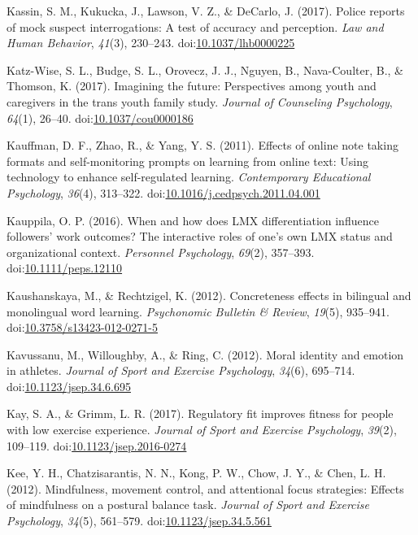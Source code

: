 \documentclass[english,man]{apa6}
\theoremstyle{definition}
\theoremstyle{definition}
\theoremstyle{definition}
\theoremstyle{remark}
\begin{document}
\hypertarget{ref-Kassin2017}{}
Kassin, S. M., Kukucka, J., Lawson, V. Z., \& DeCarlo, J. (2017). Police
reports of mock suspect interrogations: A test of accuracy and
perception. \emph{Law and Human Behavior}, \emph{41}(3), 230--243.
doi:\href{https://doi.org/10.1037/lhb0000225}{10.1037/lhb0000225}

\hypertarget{ref-Katz-Wise2017}{}
Katz-Wise, S. L., Budge, S. L., Orovecz, J. J., Nguyen, B.,
Nava-Coulter, B., \& Thomson, K. (2017). Imagining the future:
Perspectives among youth and caregivers in the trans youth family study.
\emph{Journal of Counseling Psychology}, \emph{64}(1), 26--40.
doi:\href{https://doi.org/10.1037/cou0000186}{10.1037/cou0000186}

\hypertarget{ref-Kauffman2011}{}
Kauffman, D. F., Zhao, R., \& Yang, Y. S. (2011). Effects of online note
taking formats and self-monitoring prompts on learning from online text:
Using technology to enhance self-regulated learning. \emph{Contemporary
Educational Psychology}, \emph{36}(4), 313--322.
doi:\href{https://doi.org/10.1016/j.cedpsych.2011.04.001}{10.1016/j.cedpsych.2011.04.001}

\hypertarget{ref-Kauppila2016}{}
Kauppila, O. P. (2016). When and how does LMX differentiation influence
followers' work outcomes? The interactive roles of one's own LMX status
and organizational context. \emph{Personnel Psychology}, \emph{69}(2),
357--393.
doi:\href{https://doi.org/10.1111/peps.12110}{10.1111/peps.12110}

\hypertarget{ref-Kaushanskaya2012}{}
Kaushanskaya, M., \& Rechtzigel, K. (2012). Concreteness effects in
bilingual and monolingual word learning. \emph{Psychonomic Bulletin \&
Review}, \emph{19}(5), 935--941.
doi:\href{https://doi.org/10.3758/s13423-012-0271-5}{10.3758/s13423-012-0271-5}

\hypertarget{ref-Kavussanu2012}{}
Kavussanu, M., Willoughby, A., \& Ring, C. (2012). Moral identity and
emotion in athletes. \emph{Journal of Sport and Exercise Psychology},
\emph{34}(6), 695--714.
doi:\href{https://doi.org/10.1123/jsep.34.6.695}{10.1123/jsep.34.6.695}

\hypertarget{ref-Kay2017}{}
Kay, S. A., \& Grimm, L. R. (2017). Regulatory fit improves fitness for
people with low exercise experience. \emph{Journal of Sport and Exercise
Psychology}, \emph{39}(2), 109--119.
doi:\href{https://doi.org/10.1123/jsep.2016-0274}{10.1123/jsep.2016-0274}

\hypertarget{ref-Kee2012}{}
Kee, Y. H., Chatzisarantis, N. N., Kong, P. W., Chow, J. Y., \& Chen, L.
H. (2012). Mindfulness, movement control, and attentional focus
strategies: Effects of mindfulness on a postural balance task.
\emph{Journal of Sport and Exercise Psychology}, \emph{34}(5), 561--579.
doi:\href{https://doi.org/10.1123/jsep.34.5.561}{10.1123/jsep.34.5.561}
\end{document}
